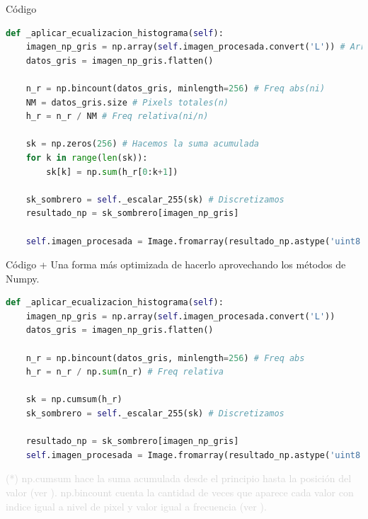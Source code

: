 \documentclass{beamer}
\begin{document}
\begin{frame}[fragile]{Código}
	\justifying
	
	\begin{lstlisting}[language=Python]
def _aplicar_ecualizacion_histograma(self):
	imagen_np_gris = np.array(self.imagen_procesada.convert('L')) # Array de la forma (m. n).
	datos_gris = imagen_np_gris.flatten()
	
	n_r = np.bincount(datos_gris, minlength=256) # Freq abs(ni)
	NM = datos_gris.size # Pixels totales(n)
	h_r = n_r / NM # Freq relativa(ni/n)
	
	sk = np.zeros(256) # Hacemos la suma acumulada
	for k in range(len(sk)):
		sk[k] = np.sum(h_r[0:k+1])
	
	sk_sombrero = self._escalar_255(sk) # Discretizamos
	resultado_np = sk_sombrero[imagen_np_gris]
	
	self.imagen_procesada = Image.fromarray(resultado_np.astype('uint8')).convert('RGB')
	\end{lstlisting}
\end{frame}

\begin{frame}[fragile]{Código +}
	\justifying
	Una forma más optimizada de hacerlo aprovechando los métodos de Numpy.
	
	\begin{lstlisting}[language=Python]
def _aplicar_ecualizacion_histograma(self):
	imagen_np_gris = np.array(self.imagen_procesada.convert('L'))
	datos_gris = imagen_np_gris.flatten()
	
	n_r = np.bincount(datos_gris, minlength=256) # Freq abs
	h_r = n_r / np.sum(n_r) # Freq relativa
	
	sk = np.cumsum(h_r)
	sk_sombrero = self._escalar_255(sk) # Discretizamos
	
	resultado_np = sk_sombrero[imagen_np_gris]
	self.imagen_procesada = Image.fromarray(resultado_np.astype('uint8')).convert('RGB')
	\end{lstlisting}
	
	\vfill
	\footnotesize \textcolor{lightgray}{(*) np.cumsum hace la suma acumulada desde el principio hasta la posición del valor (ver \cite{numpy-cumsum}). np.bincount cuenta la cantidad de veces que aparece cada valor con indice igual a nivel de pixel y valor igual a frecuencia (ver \cite{numpy-bincount}).}
\end{frame}
\end{document}

